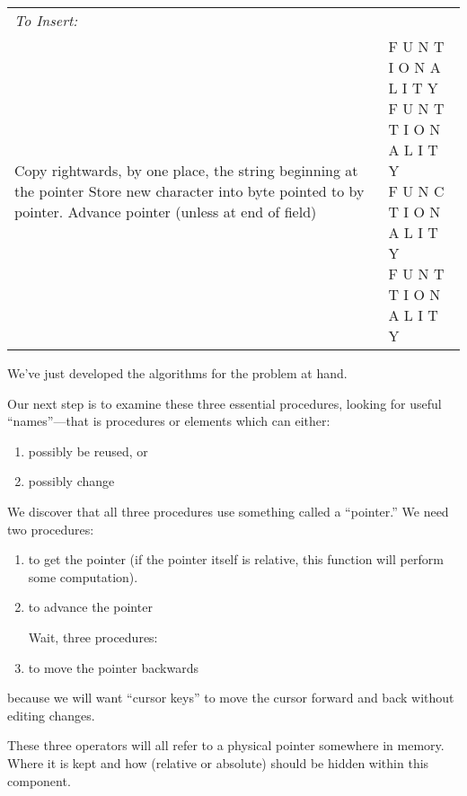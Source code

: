 \begin{tabular}{>{\raggedright}p{2in}>{\ttfamily}p{2in}}
\emph{To Insert:}&\\
Copy rightwards, by one place,
the string beginning at the pointer
Store new character into
byte pointed to by pointer.
Advance pointer (unless at end of field)
& \parbox[t]{2in}{
  F U N T I O N A L I T Y\\
  F U N T T I O N A L I T Y\\
  F U N C T I O N A L I T Y\\
  F U N T T I O N A L I T Y} \\

\end{tabular}
\vspace{2ex}

\noindent We've just developed the algorithms for the problem at hand.

Our next step is to examine these three essential procedures, looking
for useful ``names''---that is procedures or elements which can
either:

\begin{enumerate}
\item possibly be reused, or

\item possibly change
\end{enumerate}

We discover that all three procedures use something called a ``pointer.''
We need two procedures:

\begin{enumerate}
\item to get the pointer (if the pointer itself is relative, this function will perform
some computation).

\item to advance the pointer

Wait, three procedures:

\item to move the pointer backwards
\end{enumerate}

because we will want ``cursor keys'' to move the cursor forward and back
without editing changes.

These three operators will all refer to a physical pointer somewhere
in memory. Where it is kept and how (relative or absolute) should be
hidden within this component.

